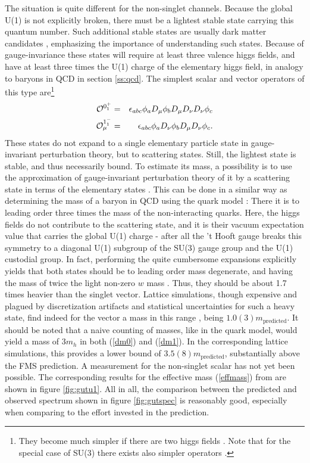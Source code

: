 \documentclass[final,twoside,12pt]{article}
\newcommand*{\no}{\noindent}
\newcommand*{\bea}{\begin{eqnarray}}
\newcommand*{\eea}{\end{eqnarray}}
\newcommand*{\pref}[1]{(\ref{#1})}
\newcommand*{\1}{1\!\!\!\bot}
\newcommand*{\op}{{\cal O}}
\begin{document}
The situation is quite different for the non-singlet channels. Because the global U(1) is not explicitly broken, there must be a lightest stable state carrying this quantum number. Such additional stable states are usually dark matter candidates \cite{Morrissey:2009tf}, emphasizing the importance of understanding such states. Because of gauge-invariance these states will require at least three valence higgs fields, and have at least three times the U(1) charge of the elementary higgs field, in analogy to baryons in QCD in section \ref{ss:qcd}. The simplest scalar and vector operators of this type are\footnote{They become much simpler if there are two higgs fields \cite{Iida:2007qp}. Note that for the special case of SU(3) there exists also simpler operators \cite{Maas:2017xzh}.} \cite{Maas:2017xzh}
\bea
\op^{0^+_1}&=&\epsilon_{abc}\phi_a D_\mu\phi_b D_\mu D_\nu D_\nu\phi_c\label{dm0}\\
\op^{1^-_1}_\mu&=&\epsilon_{abc}\phi_a D_\nu\phi_b D_\mu D_\nu\phi_c\label{dm1}.
\eea
\no These states do not expand to a single elementary particle state in gauge-invariant perturbation theory, but to scattering states. Still, the lightest state is stable, and thus necessarily bound. To estimate its mass, a possibility is to use the approximation of gauge-invariant perturbation theory of it by a scattering state in terms of the elementary states \cite{Maas:2017xzh}. This can be done in a similar way as determining the mass of a baryon in QCD using the quark model \cite{BeiglboCk:2006lfa}: There it is to leading order three times the mass of the non-interacting quarks. Here, the higgs fields do not contribute to the scattering state, and it is their vacuum expectation value that carries the global U(1) charge - after all the 't Hooft gauge breaks this symmetry to a diagonal U(1) subgroup of the SU(3) gauge group and the U(1) custodial group. In fact, performing the quite cumbersome expansions explicitly yields that both states should be to leading order mass degenerate, and having the mass of twice the light non-zero $w$ mass \cite{Maas:2017xzh}. Thus, they should be about 1.7 times heavier than the singlet vector. Lattice simulations, though expensive and plagued by discretization artifacts and statistical uncertainties for such a heavy state, find indeed for the vector a mass in this range \cite{Maas:unpublishedtoerek}, being $1.0(3)m_\text{predicted}$. It should be noted that a naive counting of masses, like in the quark model, would yield a mass of $3m_h$ in both \pref{dm0} and \pref{dm1}. In the corresponding lattice simulations, this provides a lower bound of $3.5(8)m_\text{predicted}$, substantially above the FMS prediction. A measurement for the non-singlet scalar has not yet been possible. The corresponding results for the effective mass \pref{effmass} from \cite{Maas:2017pcw,Maas:unpublishedtoerek} are shown in figure \ref{fig:gutu1}. All in all, the comparison between the predicted and observed spectrum shown in figure \ref{fig:gutspec} is reasonably good, especially when comparing to the effort invested in the prediction.
\end{document}
